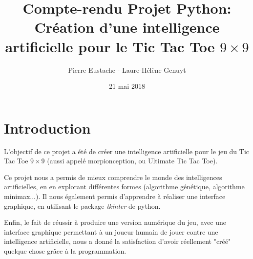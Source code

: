 \documentclass[10pt, french]{article}
\title{Compte-rendu Projet Python: \\ Création d'une intelligence artificielle pour le Tic Tac Toe $9\times9$ }
\author{Pierre Eustache - Laure-Hélène Genuyt }
\date{21 mai 2018}
\begin{document}
\maketitle
\tableofcontents



\paragraph{}
    
\section{Introduction}
\par L'objectif de ce projet a été de créer une intelligence artificielle pour le jeu du Tic Tac Toe $9\times9$ (aussi appelé morpionception, ou Ultimate Tic Tac Toe). \\
\par Ce projet nous a permis de mieux comprendre le monde des intelligences artificielles, en en explorant différentes formes (algorithme génétique, algorithme minimax...). 
Il nous également permis d'apprendre à réaliser une interface graphique, en utilisant le package \textit{tkinter} de python. \\
\par Enfin, le fait de réussir à produire une version numérique du jeu, avec une interface graphique permettant à un joueur humain de jouer contre une intelligence artificielle, nous a donné la satisfaction d'avoir réellement "créé" quelque chose grâce à la programmation. 
\end{document}
